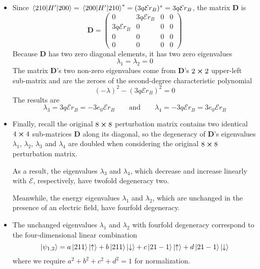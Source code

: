 \documentclass[11pt, a4paper]{article}
\newcommand{\eqtext}[1]{\qquad \text{#1} \qquad}
\newcommand{\mat}[1]{\mathbf{#1}} %
\newcommand{\p}{\psi}  %
\newcommand{\E}{\mathcal{E}}  %
\newcommand{\ua}{\uparrow}  %
\newcommand{\da}{\downarrow}  %
\begin{document}
\begin{itemize}
	\item Since $ \mel{210}{H'}{200} = \mel{200}{H'}{210}^{*} = (3q\E r_{B})^{*} = 3q\E r_{B}  $, the matrix $ \mat{D} $ is
	\begin{equation*}
		\mat{D} =
		\begin{pmatrix}
			0 & 3q\E r_{B} & 0 & 0\\
			3q\E r_{B} & 0 & 0 & 0\\
			0 & 0 & 0 & 0 \\
			0 & 0 & 0 & 0
		\end{pmatrix}
	\end{equation*}
	Because $ \mat{D}  $ has two zero diagonal elements, it has two zero eigenvalues
	\begin{equation*}
		\lambda_{1} = \lambda_{2} = 0
	\end{equation*}
	The matrix $ \mat{D} $'s two non-zero eigenvalues come from $ \mat{D} $'s $ 2 \cross 2 $ upper-left sub-matrix and are the zeroes of the second-degree characteristic polynomial
	\begin{equation*}
		(- \lambda)^{2} - (3 q \E r_{B})^{2} = 0
	\end{equation*}
	The results are
	\begin{equation*}
		\lambda_{3} = 3q\E r_{B} = -3e_{0}\E r_{B} \eqtext{and} \lambda_{4} = -3q\E r_{B} = 3e_{0}\E r_{B}
	\end{equation*}
	
	\item Finally, recall the original $ 8 \cross 8 $ perturbation matrix contains two identical $ 4 \cross 4 $ sub-matrices $ \mat{D} $ along its diagonal, so the degeneracy of $ \mat{D} $'s eigenvalues $ \lambda_{1} $, $ \lambda_{2} $, $ \lambda_{3} $ and $ \lambda_{4} $ are doubled when considering the original $ 8 \cross 8 $ perturbation matrix.
	
	As a result, the eigenvalues $ \lambda_{3} $ and $ \lambda_{4} $, which decrease and increase linearly with $ \E $, respectively, have twofold degeneracy two. 
	
	Meanwhile, the energy eigenvalues $ \lambda_{1} $ and $ \lambda_{2} $, which are unchanged in the presence of an electric field, have fourfold degeneracy.
	
	\item The unchanged eigenvalues $ \lambda_{1} $ and $ \lambda_{2} $ with fourfold degeneracy correspond to the four-dimensional linear combination
	\begin{equation*}
		\ket{\p_{1,2}} = a \ket{211}\ket{\ua} + b \ket{211}\ket{\da} + c \ket{21-1}\ket{\ua} + d \ket{21-1}\ket{\da}
	\end{equation*}
	where we require $ a^{2} + b^{2} + c^{2} + d^{2} = 1 $ for normalization.
	

\end{itemize}
\end{document}
